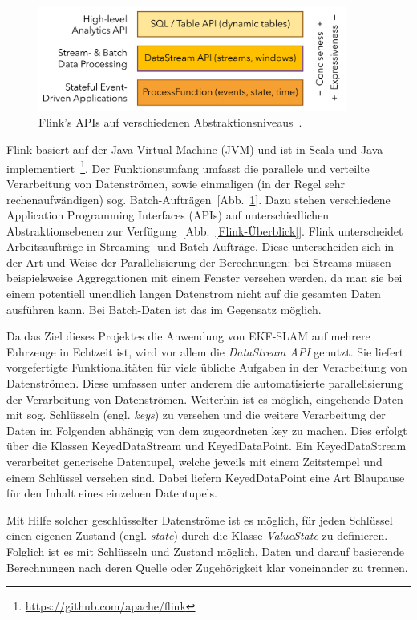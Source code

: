 \documentclass[11pt]{article}
\begin{document}
\begin{figure}[!t]
	\centering
	\includegraphics[width=4in]{Flink-api-stack.png}
	\caption{Flink's APIs auf verschiedenen Abstraktionsniveaus~\cite{Flink-APIs-Link}.}
	\label{Flink-APIs}
\end{figure}

Flink basiert auf der Java Virtual Machine (JVM) und ist in Scala und Java implementiert~\footnote{\url{https://github.com/apache/flink}}. Der Funktionsumfang umfasst die parallele und verteilte Verarbeitung von Datenströmen, sowie einmaligen (in der Regel sehr rechenaufwändigen) sog. Batch-Aufträgen~[Abb.~\ref{Flink-APIs}]. Dazu stehen verschiedene Application Programming Interfaces (APIs) auf unterschiedlichen Abstraktionsebenen zur Verfügung~[Abb.~\ref{Flink-Überblick}]. Flink unterscheidet Arbeitsaufträge in Streaming- und Batch-Auf\-trä\-ge. Diese unterscheiden sich in der Art und Weise der Parallelisierung der Berechnungen: bei Streams müssen beispielsweise Aggregationen mit einem Fenster versehen werden, da man sie bei einem potentiell unendlich langen Datenstrom nicht auf die gesamten Daten ausführen kann. Bei Batch-Daten ist das im Gegensatz möglich.

Da das Ziel dieses Projektes die Anwendung von EKF-SLAM auf mehrere Fahrzeuge in Echtzeit ist, wird vor allem die \textit{DataStream API} genutzt. Sie liefert vorgefertigte Funktionalitäten für viele übliche Aufgaben in der Verarbeitung von Datenströmen. Diese umfassen unter anderem die automatisierte parallelisierung der Verarbeitung von Datenströmen. Weiterhin ist es möglich, eingehende Daten mit sog. Schlüsseln (engl. \textit{keys}) zu versehen und die weitere Verarbeitung der Daten im Folgenden abhängig von dem zugeordneten key zu machen. Dies erfolgt über die Klassen KeyedDataStream und KeyedDataPoint. Ein KeyedDataStream verarbeitet generische Datentupel, welche jeweils mit einem Zeitstempel und einem Schlüssel versehen sind. Dabei liefern KeyedDataPoint eine Art Blaupause für den Inhalt eines einzelnen Datentupels.

Mit Hilfe solcher geschlüsselter Datenströme ist es möglich, für jeden Schlüssel einen eigenen Zustand (engl. \textit{state}) durch die Klasse \textit{ValueState} zu definieren. Folglich ist es mit Schlüsseln und Zustand möglich, Daten und darauf basierende Berechnungen nach deren Quelle oder Zugehörigkeit klar voneinander zu trennen.
\end{document}
